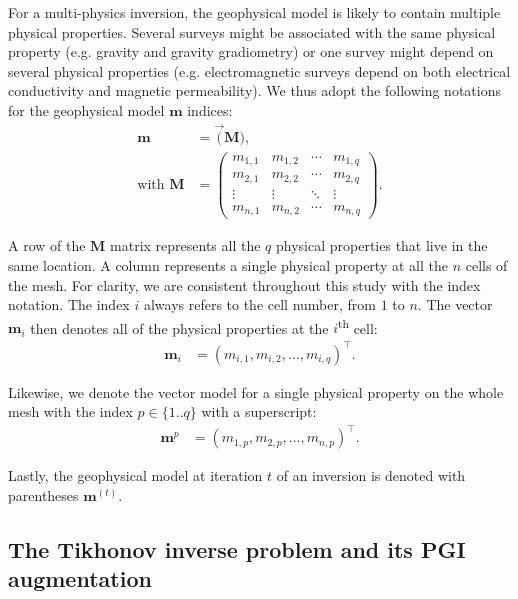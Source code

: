\documentclass[extra, mreferee]{gji_joint} %
\begin{document}
For a multi-physics inversion, the geophysical model is likely to contain multiple physical properties. Several surveys might be associated with the same physical property (e.g. gravity and gravity gradiometry) or one survey might depend on several physical properties (e.g. electromagnetic surveys depend on both electrical conductivity and magnetic permeability). We thus adopt the following notations for the geophysical model $\mathbf{m}$ indices:
\begin{align}
\mathbf{m} &= \vec(\mathbf{M}), \\
\text{with } \mathbf{M} &=
 \begin{pmatrix}
 m_{1, 1} & m_{1, 2} & \cdots & m_{1, q} \\
 m_{2, 1} & m_{2, 2} & \cdots & m_{2, q} \\
 \vdots & \vdots & \ddots & \vdots \\
 m_{n, 1} & m_{n, 2} & \cdots & m_{n, q}
 \end{pmatrix}
\label{m_convention_1}.
\end{align}

A row of the $\mathbf{M}$ matrix represents all the $q$ physical properties that live in the same location. A column represents a single physical property at all the $n$ cells of the mesh. For clarity, we are consistent throughout this study with the index notation. The index $i$ always refers to the cell number, from $1$ to $n$. The vector $\mathbf{m}_i$ then denotes all of the physical properties at the $i$\textsuperscript{th} cell:
\begin{align}
\mathbf{m}_i &= (m_{i, 1}, m_{i, 2}, \dotsc, m_{i, q})^\top.
\label{m_convention_2}
\end{align}

Likewise, we denote the vector model for a single physical property on the whole mesh with the index $p \in \{1..q\}$ with a superscript:
\begin{align}
\mathbf{m}^p &= (m_{1, p}, m_{2, p}, \dotsc, m_{n, p})^\top.
\label{m_convention_3}
\end{align}

Lastly, the geophysical model at iteration $t$ of an inversion is denoted with parentheses $\mathbf{m}^{(t)}$.

\subsection{The Tikhonov inverse problem and its PGI augmentation} \label{section:tik}
\end{document}
